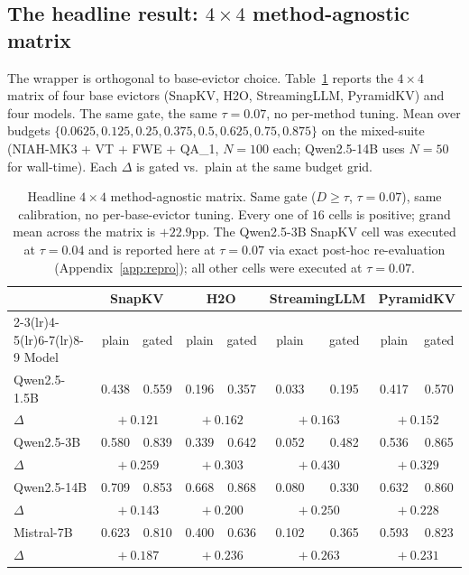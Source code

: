 \documentclass{article}
\begin{document}
\subsection{The headline result: $4 \times 4$ method-agnostic matrix}
\label{subsec:matrix}

The wrapper is orthogonal to base-evictor choice. Table~\ref{tab:matrix} reports
the $4 \times 4$ matrix of four base evictors (SnapKV, H2O, StreamingLLM,
PyramidKV) and four models. The same gate, the same $\tau = 0.07$, no per-method
tuning. Mean over budgets $\{0.0625, 0.125, 0.25, 0.375, 0.5, 0.625, 0.75,
0.875\}$ on the mixed-suite (NIAH-MK3 + VT + FWE + QA\_1, $N = 100$ each;
Qwen2.5-14B uses $N = 50$ for wall-time). Each $\Delta$ is gated vs.\ plain at
the same budget grid.

\begin{table}[t]
\centering
\caption{Headline $4 \times 4$ method-agnostic matrix. Same gate ($D \ge \tau$,
$\tau = 0.07$), same calibration, no per-base-evictor tuning. Every one of $16$
cells is positive; grand mean across the matrix is $+22.9$pp. The Qwen2.5-3B
SnapKV cell was executed at $\tau = 0.04$ and is reported here at
$\tau = 0.07$ via exact post-hoc re-evaluation (Appendix~\ref{app:repro});
all other cells were executed at $\tau = 0.07$.}
\label{tab:matrix}
\begin{tabular}{lcccccccc}
\toprule
 & \multicolumn{2}{c}{SnapKV} & \multicolumn{2}{c}{H2O} & \multicolumn{2}{c}{StreamingLLM} & \multicolumn{2}{c}{PyramidKV} \\
\cmidrule(lr){2-3}\cmidrule(lr){4-5}\cmidrule(lr){6-7}\cmidrule(lr){8-9}
Model & plain & gated & plain & gated & plain & gated & plain & gated \\
\midrule
Qwen2.5-1.5B & 0.438 & 0.559 & 0.196 & 0.357 & 0.033 & 0.195 & 0.417 & 0.570 \\
$\Delta$      & \multicolumn{2}{c}{$\!+\!0.121$} & \multicolumn{2}{c}{$\!+\!0.162$} & \multicolumn{2}{c}{$\!+\!0.163$} & \multicolumn{2}{c}{$\!+\!0.152$} \\
\midrule
Qwen2.5-3B   & 0.580 & 0.839 & 0.339 & 0.642 & 0.052 & 0.482 & 0.536 & 0.865 \\
$\Delta$      & \multicolumn{2}{c}{$\!+\!0.259$} & \multicolumn{2}{c}{$\!+\!0.303$} & \multicolumn{2}{c}{$\!+\!0.430$} & \multicolumn{2}{c}{$\!+\!0.329$} \\
\midrule
Qwen2.5-14B  & 0.709 & 0.853 & 0.668 & 0.868 & 0.080 & 0.330 & 0.632 & 0.860 \\
$\Delta$      & \multicolumn{2}{c}{$\!+\!0.143$} & \multicolumn{2}{c}{$\!+\!0.200$} & \multicolumn{2}{c}{$\!+\!0.250$} & \multicolumn{2}{c}{$\!+\!0.228$} \\
\midrule
Mistral-7B    & 0.623 & 0.810 & 0.400 & 0.636 & 0.102 & 0.365 & 0.593 & 0.823 \\
$\Delta$      & \multicolumn{2}{c}{$\!+\!0.187$} & \multicolumn{2}{c}{$\!+\!0.236$} & \multicolumn{2}{c}{$\!+\!0.263$} & \multicolumn{2}{c}{$\!+\!0.231$} \\
\bottomrule
\end{tabular}
\end{table}
\end{document}
